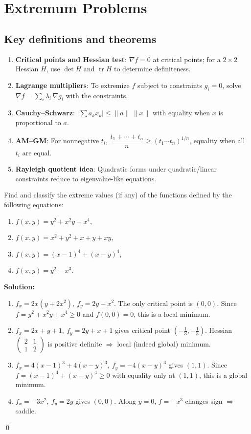 \section{Extremum Problems}
\subsection*{Key definitions and theorems}
\begin{enumerate}[label=(\roman*)]
    \item \textbf{Critical points and Hessian test}: $\nabla f=0$ at critical points; for a $2\times2$ Hessian $H$, use $\det H$ and $\operatorname{tr} H$ to determine definiteness.
    \item \textbf{Lagrange multipliers}: To extremize $f$ subject to constraints $g_i=0$, solve $\nabla f=\sum_i \lambda_i\,\nabla g_i$ with the constraints.
    \item \textbf{Cauchy--Schwarz}: $\big|\sum a_k x_k\big|\le \|a\|\,\|x\|$ with equality when $x$ is proportional to $a$.
    \item \textbf{AM--GM}: For nonnegative $t_i$, $\dfrac{t_1+\cdots+t_n}{n}\ge (t_1\cdots t_n)^{1/n}$, equality when all $t_i$ are equal.
    \item \textbf{Rayleigh quotient idea}: Quadratic forms under quadratic/linear constraints reduce to eigenvalue-like equations.
\end{enumerate}


\begin{problembox}
Find and classify the extreme values (if any) of the functions defined by the following equations:
\begin{enumerate}[label=(\alph*)]
    \item \( f(x, y) = y^2 + x^2y + x^4 \),
    \item \( f(x, y) = x^2 + y^2 + x + y + xy \),
    \item \( f(x, y) = (x - 1)^4 + (x - y)^4 \),
    \item \( f(x, y) = y^2 - x^3 \).
\end{enumerate}
\end{problembox}

\bigskip\noindent\textbf{Solution:}
\begin{enumerate}[label=(\alph*)]
    \item $f_x=2x(y+2x^2),\ f_y=2y+x^2$. The only critical point is $(0,0)$. Since $f=y^2+x^2y+x^4\ge 0$ and $f(0,0)=0$, this is a local minimum.
    \item $f_x=2x+y+1,\ f_y=2y+x+1$ gives critical point $(-\tfrac13,-\tfrac13)$. Hessian $\begin{pmatrix}2&1\\1&2\end{pmatrix}$ is positive definite $\Rightarrow$ local (indeed global) minimum.
    \item $f_x=4(x-1)^3+4(x-y)^3,\ f_y=-4(x-y)^3$ gives $(1,1)$. Since $f=(x-1)^4+(x-y)^4\ge0$ with equality only at $(1,1)$, this is a global minimum.
    \item $f_x=-3x^2,\ f_y=2y$ gives $(0,0)$. Along $y=0$, $f=-x^3$ changes sign $\Rightarrow$ saddle.
\end{enumerate}\qed



